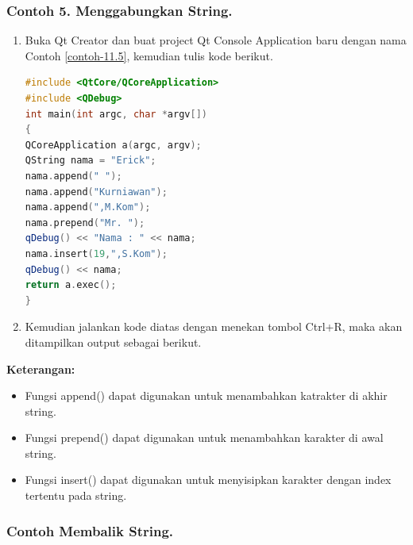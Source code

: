 \subsubsection*{Contoh 5. Menggabungkan String.}

\begin{enumerate}

\item
  Buka Qt Creator dan buat project Qt Console Application baru dengan
  nama Contoh \ref{contoh-11.5}, kemudian tulis kode berikut.

\begin{lstlisting}[language=c++, caption= Menggabungkan String, label=contoh-11.5]
#include <QtCore/QCoreApplication>
#include <QDebug>
int main(int argc, char *argv[])
{
QCoreApplication a(argc, argv);
QString nama = "Erick";
nama.append(" ");
nama.append("Kurniawan");
nama.append(",M.Kom");
nama.prepend("Mr. ");
qDebug() << "Nama : " << nama;
nama.insert(19,",S.Kom");
qDebug() << nama;
return a.exec();
}
\end{lstlisting}
\item
  Kemudian jalankan kode diatas dengan menekan tombol Ctrl+R, maka akan
  ditampilkan output sebagai berikut.
  
  \begin{lcverbatim}
  \end{lcverbatim}
\end{enumerate}

\textbf{Keterangan:}

\begin{itemize}

\item
  Fungsi append() dapat digunakan untuk menambahkan katrakter di akhir
  string.
\item
  Fungsi prepend() dapat digunakan untuk menambahkan karakter di awal
  string.
\item
  Fungsi insert() dapat digunakan untuk menyisipkan karakter dengan
  index tertentu pada string.
\end{itemize}

\subsubsection*{Contoh  Membalik String.}

